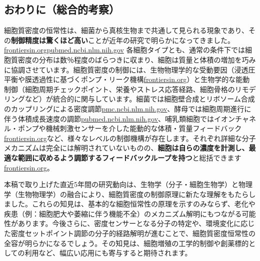 \subsection{おわりに（総合的考察）}

細胞質密度の恒常性は、細菌から真核生物まで共通して見られる現象であり、その\textbf{制御精度は驚くほど高い}ことが近年の研究で明らかになってきました。\href{https://www.frontiersin.org/journals/cell-and-developmental-biology/articles/10.3389/fcell.2022.1017499/full\#:~:text=match\%20at\%20L637\%20observed\%20CV,cell\%20volume\%20in\%20individual\%20cells}{frontiersin.org}\href{https://pubmed.ncbi.nlm.nih.gov/34100714/\#:~:text=variation\%20,dependent\%20density}{pubmed.ncbi.nlm.nih.gov} 各細胞タイプとも、通常の条件下では細胞質密度の分布は数％程度のばらつきに収まり、細胞は質量と体積の増加を巧みに協調させています。細胞質密度の制御には、生物物理学的な受動要因（浸透圧平衡や膜透過性に基づくポンプ・リーク機構\href{https://www.frontiersin.org/journals/cell-and-developmental-biology/articles/10.3389/fcell.2022.1017499/full\#:~:text=The\%20simplest\%20physical\%20model\%20of,pump\%20leak\%20mechanism\%20predicts\%20that}{frontiersin.org}）と生物学的な能動制御（細胞周期チェックポイント、栄養やストレス応答経路、細胞骨格のリモデリングなど）が統合的に関与しています。細菌では細胞壁合成とリボソーム合成のカップリングによる密度調節\href{https://pmc.ncbi.nlm.nih.gov/articles/PMC11065075/\#:~:text=these\%20processes\%20are\%20indeed\%20coupled4,picture\%20that\%20emerges\%20is\%20that}{pmc.ncbi.nlm.nih.gov}、酵母では細胞周期進行に伴う体積成長速度の調節\href{https://pubmed.ncbi.nlm.nih.gov/34100714/\#:~:text=rapidly\%20at\%20cell\%20birth,cycle\%20arrests}{pubmed.ncbi.nlm.nih.gov}、哺乳類細胞ではイオンチャネル・ポンプや機械刺激センサーを介した能動的な体積・質量フィードバック\href{https://www.frontiersin.org/journals/cell-and-developmental-biology/articles/10.3389/fcell.2022.1017499/full\#:~:text=is\%20independent\%20of\%20the\%20cell,during\%20transitions\%20in\%20physiological\%20state}{frontiersin.org}など、様々なレベルの制御機構が存在します。それぞれ詳細な分子メカニズムは完全には解明されていないものの、\textbf{細胞は自らの濃度を計測し、最適な範囲に収めるよう調節するフィードバックループを持つ}と総括できます\href{https://www.frontiersin.org/journals/cell-and-developmental-biology/articles/10.3389/fcell.2022.1017499/full\#:~:text=,density\%20control\%20through\%20active\%20feedback}{frontiersin.org}。

本稿で取り上げた直近5年間の研究動向は、生物学（分子・細胞生物学）と物理学（生物物理学）の融合により、細胞質密度の制御原理に新たな理解をもたらしました。これらの知見は、基本的な細胞恒常性の原理を示すのみならず、老化や疾患（例：細胞肥大や萎縮に伴う機能不全）のメカニズム解明にもつながる可能性があります。今後さらに、密度センサーとなる分子の特定や、環境変化に応じた密度セットポイント調節の分子的経路解明が進むことで、細胞質密度恒常性の全容が明らかになるでしょう。その知見は、細胞増殖の工学的制御や創薬標的としての利用など、幅広い応用にも寄与すると期待されます。

